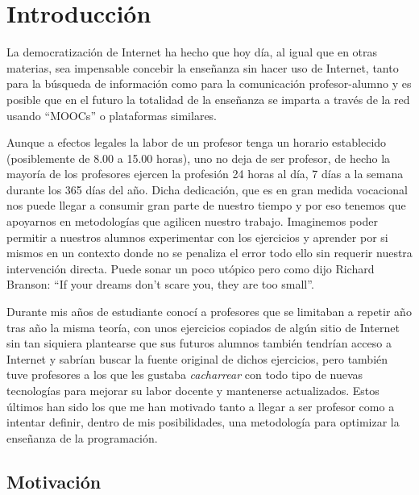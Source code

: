 \chapter{Introducción}

La democratización de Internet ha hecho que hoy día, al igual que en otras materias, sea impensable concebir la enseñanza sin hacer uso de Internet, tanto para la búsqueda de información como para la comunicación profesor-alumno y es posible que en el futuro la totalidad de la enseñanza se imparta a través de la red usando ``MOOCs'' o plataformas similares.

\bigskip
Aunque a efectos legales la labor de un profesor tenga un horario establecido (posiblemente de 8.00 a 15.00 horas), uno no deja de ser profesor, de hecho la mayoría de los profesores ejercen la profesión 24 horas al día, 7 días a la semana durante los 365 días del año. Dicha dedicación, que es en gran medida vocacional nos puede llegar a consumir gran parte de nuestro tiempo y por eso tenemos que apoyarnos en metodologías que agilicen nuestro trabajo. Imaginemos poder permitir a nuestros alumnos experimentar con los ejercicios y aprender por si mismos en un contexto donde no se penaliza el error todo ello sin requerir nuestra intervención directa. Puede sonar un poco utópico pero como dijo Richard Branson: ``If your dreams don’t scare you, they are too small''.


\bigskip
Durante mis años de estudiante conocí a profesores que se limitaban a repetir año tras año la misma teoría, con unos ejercicios copiados de algún sitio de Internet sin tan siquiera plantearse que sus futuros alumnos también tendrían acceso a Internet y sabrían buscar la fuente original de dichos ejercicios, pero también tuve profesores a los que les gustaba \textit{cacharrear} con todo tipo de nuevas tecnologías para mejorar su labor docente y mantenerse actualizados. Estos últimos han sido los que me han motivado tanto a llegar a ser profesor como a intentar definir, dentro de mis posibilidades, una metodología para optimizar la enseñanza de la programación.


\section{Motivación}

